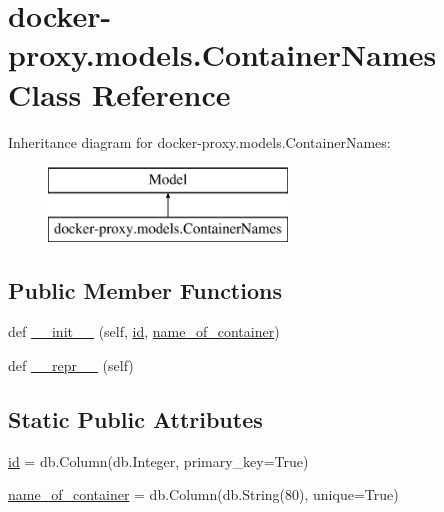 \hypertarget{classdocker-proxy_1_1models_1_1_container_names}{}\section{docker-\/proxy.models.\+Container\+Names Class Reference}
\label{classdocker-proxy_1_1models_1_1_container_names}
Inheritance diagram for docker-\/proxy.models.\+Container\+Names\+:\begin{figure}[H]
\begin{center}
\leavevmode
\includegraphics[height=2.000000cm]{classdocker-proxy_1_1models_1_1_container_names}
\end{center}
\end{figure}
\subsection*{Public Member Functions}
\begin{DoxyCompactItemize}
\item 
def \hyperlink{classdocker-proxy_1_1models_1_1_container_names_a51208829bf52ae24f5cf5891f486731b}{\+\_\+\+\_\+init\+\_\+\+\_\+} (self, \hyperlink{classdocker-proxy_1_1models_1_1_container_names_a6600e5199beb00fa24ff7b6b104cf4c1}{id}, \hyperlink{classdocker-proxy_1_1models_1_1_container_names_ae84f0bb3f85f0483fdbe500c78ca814f}{name\+\_\+of\+\_\+container})
\item 
def \hyperlink{classdocker-proxy_1_1models_1_1_container_names_a2b52c32297b1bb19f73687c9b21e5e50}{\+\_\+\+\_\+repr\+\_\+\+\_\+} (self)
\end{DoxyCompactItemize}
\subsection*{Static Public Attributes}
\begin{DoxyCompactItemize}
\item 
\hyperlink{classdocker-proxy_1_1models_1_1_container_names_a6600e5199beb00fa24ff7b6b104cf4c1}{id} = db.\+Column(db.\+Integer, primary\+\_\+key=True)
\item 
\hyperlink{classdocker-proxy_1_1models_1_1_container_names_ae84f0bb3f85f0483fdbe500c78ca814f}{name\+\_\+of\+\_\+container} = db.\+Column(db.\+String(80), unique=True)
\end{DoxyCompactItemize}


